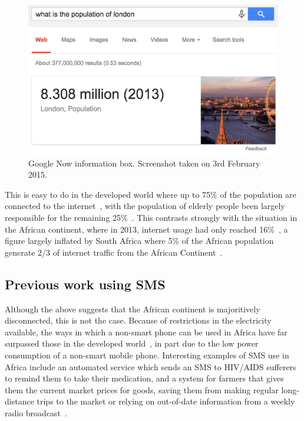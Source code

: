 \documentclass{article}
\begin{document}
\begin{figure}[htb] 
\includegraphics[width=\linewidth]{googleInstant}
\caption{Google Now information box.  Screenshot taken on 3rd February 2015.}
\label{fig:googleInstant}
\end{figure}

This is easy to do in the developed world where up to 75\% of the population are connected to the internet~\cite{ITU_Cell_Usage_2013}, with the population of elderly people been largely responsible for the remaining 25\%~\cite{Gov_Internet_Usage_UK_2014}.  This contrasts strongly with the situation in the African continent, where in 2013, internet usage had only reached 16\%~\cite{ITU_Cell_Usage_2013}, a figure largely inflated by South Africa where 5\% of the African population generate 2/3 of internet traffic from the African Continent~\cite{ITU_Cell_Usage_2013}.

\subsection{Previous work using SMS}
Although the above suggests that the African continent is majoritively disconnected, this is not the case.  Because of restrictions in the electricity available, the ways in which a non-smart phone  can be used in Africa have far surpassed those in the developed world~\cite{Fox:2011:Online}, in part due to the low power consumption of a non-smart mobile phone.  Interesting examples of SMS use in Africa include an automated service which sends an SMS to HIV/AIDS  sufferers to remind them to take their medication, and a system for farmers that gives them the current market prices for goods, saving them from making regular long-distance trips to the market or relying on out-of-date information from a weekly radio broadcast~\cite{Aker_Mobile_Phones_2010}.
\end{document}
